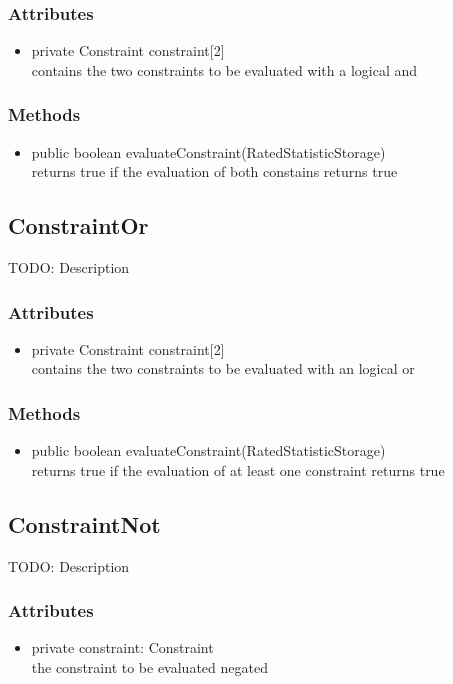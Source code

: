 \subsubsection{Attributes}
\begin{itemize}
	\item private  Constraint constraint[2]\\
	contains the two constraints to be evaluated with a logical and	
\end{itemize}
\subsubsection{Methods}
\begin{itemize}
	\item public boolean evaluateConstraint(RatedStatisticStorage)\\
	returns true if the evaluation of both constains returns true
\end{itemize}


\subsection{ConstraintOr }
TODO: Description

\subsubsection{Attributes}
\begin{itemize}
	\item private Constraint constraint[2]\\
	contains the two constraints to be evaluated with an logical or
\end{itemize}
\subsubsection{Methods}
\begin{itemize}
	\item public boolean evaluateConstraint(RatedStatisticStorage)\\
	returns true if the evaluation of at least one constraint returns true
\end{itemize}


\subsection{ConstraintNot }
TODO: Description

\subsubsection{Attributes}
\begin{itemize}
	\item private constraint: Constraint\\
	the constraint to be evaluated negated
\end{itemize}
